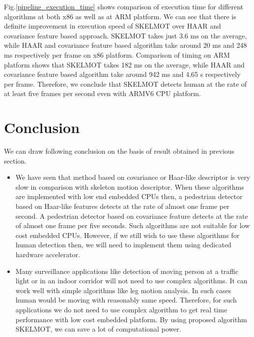 \indent Fig.\ref{pipeline_execution_time} shows comparison of execution
time for different algorithms at both x86 as well as at ARM platform. We
can see that there is definite improvement in execution speed of SKELMOT
over HAAR and covariance feature based approach. SKELMOT takes just 3.6
ms on the average, while HAAR and covariance feature based algorithm
take around 20 ms and 248 ms respectively per frame on x86 platform.
Comparison of timing on ARM platform shows that SKELMOT takes 182 ms on
the average, while HAAR and covariance feature based algorithm take
around 942 ms and 4.65 s respectively per frame. Therefore, we conclude
that SKELMOT detects human at the rate of at least five frames per second
even with ARMV6 CPU platform.
\section{Conclusion}
\indent We can draw following conclusion on the basis of result obtained 
in previous section.
\begin{itemize}
	\item 	We have seen that method based on covariance or
		Haar-like descriptor is very slow in comparison with
		skeleton motion descriptor. When these algorithms are
		implemented with low end embedded CPUs then, a
		pedestrian detector based on Haar-like features detects
		at the rate of almost one frame per second. A pedestrian
		detector based on covariance feature detects at the rate
		of almost one frame per five seconds. Such algorithms
		are not suitable for low cost embedded CPUs. However, if
		we still wish to use these algorithms for human
		detection then, we will need to implement them using
		dedicated hardware accelerator.
	\item 	Many surveillance applications like detection of moving
		person at a traffic light or in an indoor corridor will
		not need to use complex algorithms. It can work well with
		simple algorithms like leg motion analysis. In such cases
		human would be moving with reasonably same speed. Therefore,
		for such applications we do not need to use complex algorithm
		to get real time performance with low cost embedded platform.
		By using proposed algorithm SKELMOT, we can save a lot of
		computational power.
\end{itemize}
